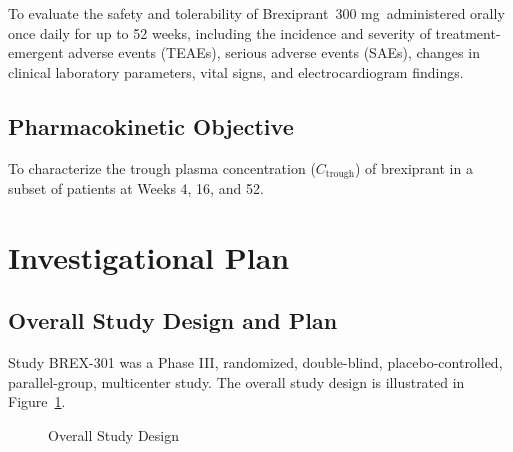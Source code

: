 \documentclass[11pt, a4paper]{article}
\newcommand{\studydrug}{Brexiprant}
\newcommand{\studydose}{300 mg}
\begin{document}
To evaluate the safety and tolerability of \studydrug\ \studydose\ administered orally once daily for up to 52 weeks, including the incidence and severity of treatment-emergent adverse events (TEAEs), serious adverse events (SAEs), changes in clinical laboratory parameters, vital signs, and electrocardiogram findings.

\subsection{Pharmacokinetic Objective}

To characterize the trough plasma concentration ($C_{\text{trough}}$) of brexiprant in a subset of patients at Weeks 4, 16, and 52.

\newpage

\section{Investigational Plan}

\subsection{Overall Study Design and Plan}

Study BREX-301 was a Phase III, randomized, double-blind, placebo-controlled, parallel-group, multicenter study. The overall study design is illustrated in Figure~\ref{fig:studydesign}.

\begin{figure}[H]
\centering
{}
\caption{Overall Study Design}
\label{fig:studydesign}
\end{figure}
\end{document}

